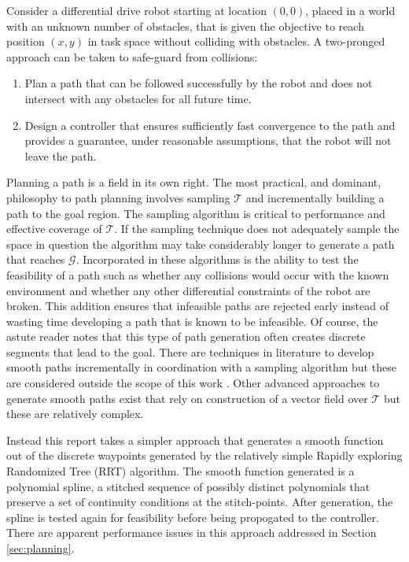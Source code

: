 \documentclass[oneside, 11pt]{book}
\begin{document}
Consider a differential drive robot starting at location $(0,0)$, placed in a world with an unknown number of obstacles, that is given the objective to reach position $(x,y)$ in task space without colliding with obstacles. A two-pronged approach can be taken to safe-guard from collisions:
\begin{enumerate}
    \item Plan a path that can be followed successfully by the robot and does not intersect with any obstacles for all future time.
    \item Design a controller that ensures sufficiently fast convergence to the path and provides a guarantee, under reasonable assumptions, that the robot will not leave the path.
\end{enumerate}

Planning a path is a field in its own right. The most practical, and dominant, philosophy to path planning involves sampling $\mathcal{T}$ and incrementally building a path to the goal region. The sampling algorithm is critical to performance and effective coverage of $\mathcal{T}$. If the sampling technique does not adequately sample the space in question the algorithm may take considerably longer to generate a path that reaches $\mathcal{G}$. Incorporated in these algorithms is the ability to test the feasibility of a path such as whether any collisions would occur with the known environment and whether any other differential constraints of the robot are broken. This addition ensures that infeasible paths are rejected early instead of wasting time developing a path that is known to be infeasible. Of course, the astute reader notes that this type of path generation often creates discrete segments that lead to the goal. There are techniques in literature to develop smooth paths incrementally in coordination with a sampling algorithm but these are considered outside the scope of this work \cite{Yang14}. Other advanced approaches to generate smooth paths exist that rely on construction of a vector field over $\mathcal{T}$ \cite{LaValle06} but these are relatively complex.

Instead this report takes a simpler approach that generates a smooth function out of the discrete waypoints generated by the relatively simple Rapidly exploring Randomized Tree (RRT) algorithm. The smooth function generated is a polynomial spline, a stitched sequence of possibly distinct polynomials that preserve a set of continuity conditions at the stitch-points. After generation, the spline is tested again for feasibility before being propogated to the controller. There are apparent performance issues in this approach addressed in Section \ref{sec:planning}.
\end{document}
